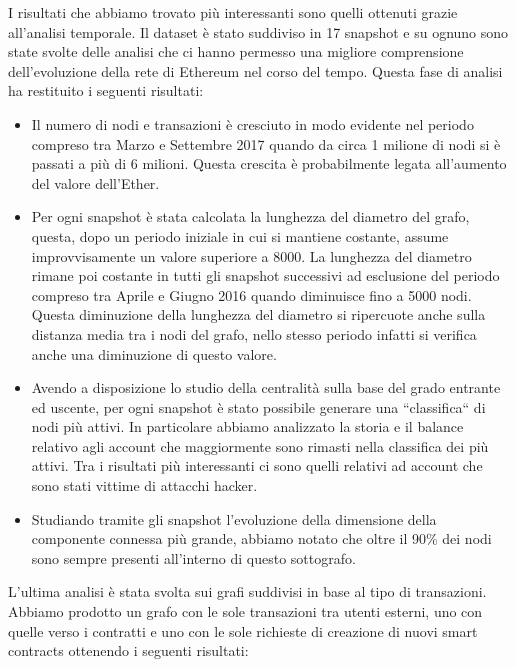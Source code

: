 \documentclass[12pt]{report}
\begin{document}
I risultati che abbiamo trovato più interessanti sono quelli ottenuti grazie all'analisi temporale. 
Il dataset è stato suddiviso in 17 snapshot e su ognuno sono state svolte delle analisi che ci hanno permesso una migliore comprensione dell'evoluzione della rete di Ethereum nel corso del tempo.
Questa fase di analisi ha restituito i seguenti risultati:

\begin{itemize}
    \item Il numero di nodi e transazioni è cresciuto in modo evidente nel periodo compreso tra Marzo e Settembre 2017 quando da circa 1 milione di nodi si è passati a più di 6 milioni.
    Questa crescita è probabilmente legata all'aumento del valore dell'Ether.
    \item Per ogni snapshot è stata calcolata la lunghezza del diametro del grafo, questa, dopo un periodo iniziale in cui si mantiene costante, assume improvvisamente un valore superiore a 8000.
    La lunghezza del diametro rimane poi costante in tutti gli snapshot successivi ad esclusione del periodo compreso tra Aprile e Giugno 2016 quando diminuisce fino a 5000 nodi.
    Questa diminuzione della lunghezza del diametro si ripercuote anche sulla distanza media tra i nodi del grafo, nello stesso periodo infatti si verifica anche una diminuzione di questo valore.
    \item Avendo a disposizione lo studio della centralità sulla base del grado entrante ed uscente, per ogni snapshot è stato possibile generare una ``classifica`` di nodi più attivi. 
    In particolare abbiamo analizzato la storia e il balance relativo agli account che maggiormente sono rimasti nella classifica dei più attivi. Tra i risultati più interessanti ci sono quelli relativi ad account che sono stati vittime di attacchi hacker.
    \item Studiando tramite gli snapshot l'evoluzione della dimensione della componente connessa più grande, abbiamo notato che oltre il 90\% dei nodi sono sempre presenti all'interno di questo sottografo. 
\end{itemize}

L'ultima analisi è stata svolta sui grafi suddivisi in base al tipo di transazioni. Abbiamo prodotto un grafo con le sole transazioni tra utenti esterni, uno con quelle verso i contratti e uno con le sole richieste di creazione di nuovi smart contracts ottenendo i seguenti risultati:
\end{document}
